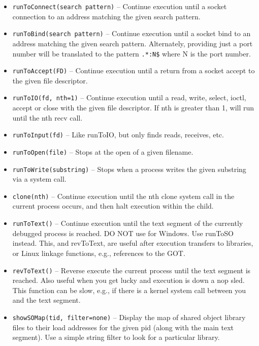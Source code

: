 \documentclass[titlepage]{article}
\begin{document}
\begin{itemize}
\item {\tt runToConnect(search pattern)} – Continue execution until a socket connection to an address matching the given search pattern.

\item {\tt runToBind(search pattern)} – Continue execution until a socket bind to an address matching the given search pattern.  Alternately, providing just
a port number will be translated to the pattern {\tt .*:N\$} where N is the port number.

\item {\tt runToAccept(FD)} – Continue execution until a return from a socket accept to the given file descriptor.

\item {\tt runToIO(fd, nth=1)} – Continue execution until a read, write, select, ioctl, accept or close with the given file descriptor.  
If nth is greater than 1, will run until the nth recv call.  

\item {\tt runToInput(fd)} -- Like runToIO, but only finds reads, receives, etc.

\item {\tt runToOpen(file)} -- Stops at the open of a given filename.

\item {\tt runToWrite(substring)} -- Stops when a process writes the given substring via a system call.

\item {\tt clone(nth)} – Continue execution until the nth clone system call in the current process occurs, and then halt execution within the child.

\item {\tt runToText()} – Continue execution until the text segment of the currently debugged process is reached.  DO NOT use for Windows.  Use runToSO instead. 
This, and revToText, are useful after execution transfers to libraries, or Linux linkage functions, e.g., references to the GOT.

\item {\tt revToText()} – Reverse execute the current process until the text segment is reached.  Also useful when you get lucky and execution is down a nop sled.  This function can be slow, e.g., if there is a kernel system call between you and the text segment.
 
\item {\tt showSOMap(tid, filter=none)} – Display the map of shared object library files to their load addresses for the given pid (along with the main text segment).
Use a simple string filter to look for a particular library.


\end{itemize}
\end{document}
